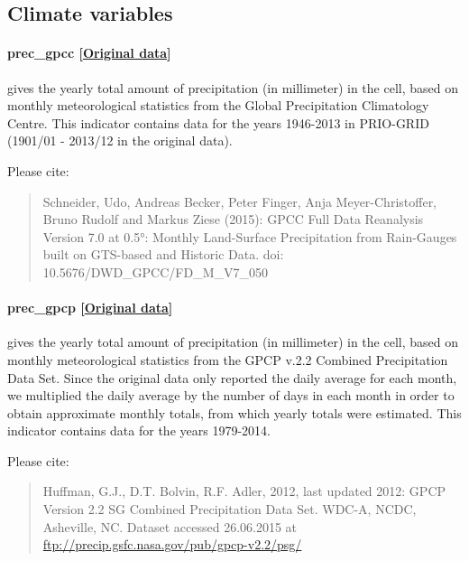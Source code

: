 \documentclass[]{book}
\begin{document}
\subsection{Climate variables}\label{climate-variables-1}

\paragraph{prec\_gpcc
{[}\href{ftp://ftp.dwd.de/pub/data/gpcc/html/fulldata_v7_doi_download.html}{Original
data}{]}}\label{prec-gpcc}

gives the yearly total amount of precipitation (in millimeter) in the
cell, based on monthly meteorological statistics from the Global
Precipitation Climatology Centre. This indicator contains data for the
years 1946-2013 in PRIO-GRID (1901/01 - 2013/12 in the original data).

Please cite:

\begin{quote}
Schneider, Udo, Andreas Becker, Peter Finger, Anja Meyer-Christoffer,
Bruno Rudolf and Markus Ziese (2015): GPCC Full Data Reanalysis Version
7.0 at 0.5°: Monthly Land-Surface Precipitation from Rain-Gauges built
on GTS-based and Historic Data. doi: 10.5676/DWD\_GPCC/FD\_M\_V7\_050
\end{quote}

\paragraph{prec\_gpcp
{[}\href{http://www.esrl.noaa.gov/psd/data/gridded/data.gpcp.html}{Original
data}{]}}\label{prec-gpcp}

gives the yearly total amount of precipitation (in millimeter) in the
cell, based on monthly meteorological statistics from the GPCP v.2.2
Combined Precipitation Data Set. Since the original data only reported
the daily average for each month, we multiplied the daily average by the
number of days in each month in order to obtain approximate monthly
totals, from which yearly totals were estimated. This indicator contains
data for the years 1979-2014.

Please cite:

\begin{quote}
Huffman, G.J., D.T. Bolvin, R.F. Adler, 2012, last updated 2012: GPCP
Version 2.2 SG Combined Precipitation Data Set. WDC-A, NCDC, Asheville,
NC. Dataset accessed 26.06.2015 at
\url{ftp://precip.gsfc.nasa.gov/pub/gpcp-v2.2/psg/}
\end{quote}
\end{document}
